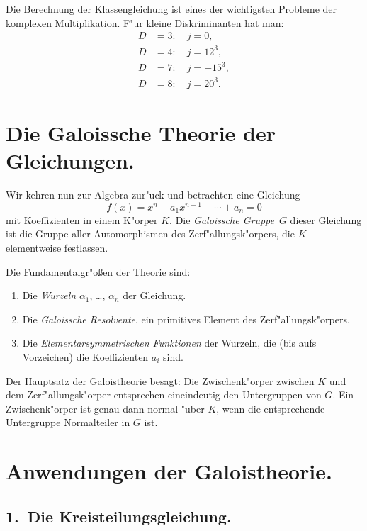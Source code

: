 \documentclass[12pt,a4paper]{article}
\theoremstyle{definition}
\begin{document}
Die Berechnung der Klassengleichung ist eines der wichtigsten Probleme der komplexen Multiplikation. F"ur kleine Diskriminanten hat man:
\begin{align*}
D &= 3:\quad j = 0,\\
D &= 4:\quad j = 12^3,\\
D &= 7:\quad j = -15^3,\\
D &= 8:\quad j = 20^3.
\end{align*}

\newpage

\section{Die Galoissche Theorie der Gleichungen.}

Wir kehren nun zur Algebra zur"uck und betrachten eine Gleichung
\begin{equation}\tag{1}
f(x) = x^n + a_1x^{n-1} + \cdots + a_n = 0
\end{equation}
mit Koeffizienten in einem K"orper $K$. Die \emph{Galoissche Gruppe}~$G$ dieser Gleichung ist die Gruppe aller Automorphismen des Zerf"allungsk"orpers, die $K$ elementweise festlassen.

Die Fundamentalgr"o\ss{}en der Theorie sind:
\begin{enumerate}[label=\arabic*.]
\item Die \emph{Wurzeln} $\alpha_1$, \ldots, $\alpha_n$ der Gleichung.
\item Die \emph{Galoissche Resolvente}, ein primitives Element des Zerf"allungsk"orpers.
\item Die \emph{Elementarsymmetrischen Funktionen} der Wurzeln, die (bis aufs Vorzeichen) die Koeffizienten $a_i$ sind.
\end{enumerate}

Der Hauptsatz der Galoistheorie besagt: Die Zwischenk"orper zwischen $K$ und dem Zerf"allungsk"orper entsprechen eineindeutig den Untergruppen von $G$. Ein Zwischenk"orper ist genau dann normal "uber $K$, wenn die entsprechende Untergruppe Normalteiler in $G$ ist.

\newpage

\section{Anwendungen der Galoistheorie.}

\subsection*{1.~Die Kreisteilungsgleichung.}
\end{document}
